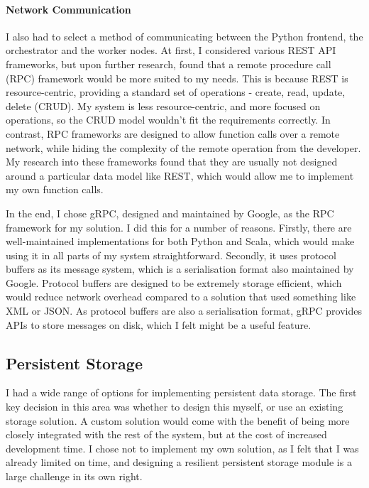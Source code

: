 \paragraph{Network Communication} 
I also had to select a method of communicating between the Python frontend, the orchestrator and the worker nodes. At first, I considered various REST API frameworks, but upon further research, found that a remote procedure call (RPC) framework would be more suited to my needs. This is because REST is resource-centric, providing a standard set of operations - create, read, update, delete (CRUD). My system is less resource-centric, and more focused on operations, so the CRUD model wouldn't fit the requirements correctly. In contrast, RPC frameworks are designed to allow function calls over a remote network, while hiding the complexity of the remote operation from the developer. My research into these frameworks found that they are usually not designed around a particular data model like REST, which would allow me to implement my own function calls. 

In the end, I chose gRPC, designed and maintained by Google, as the RPC framework for my solution. I did this for a number of reasons. Firstly, there are well-maintained implementations for both Python and Scala, which would make using it in all parts of my system straightforward. Secondly, it uses protocol buffers as its message system, which is a serialisation format also maintained by Google. Protocol buffers are designed to be extremely storage efficient, which would reduce network overhead compared to a solution that used something like XML or JSON. As protocol buffers are also a serialisation format, gRPC provides APIs to store messages on disk, which I felt might be a useful feature.


\subsection{Persistent Storage}
I had a wide range of options for implementing persistent data storage. The first key decision in this area was whether to design this myself, or use an existing storage solution. A custom solution would come with the benefit of being more closely integrated with the rest of the system, but at the cost of increased development time. I chose not to implement my own solution, as I felt that I was already limited on time, and designing a resilient persistent storage module is a large challenge in its own right.

